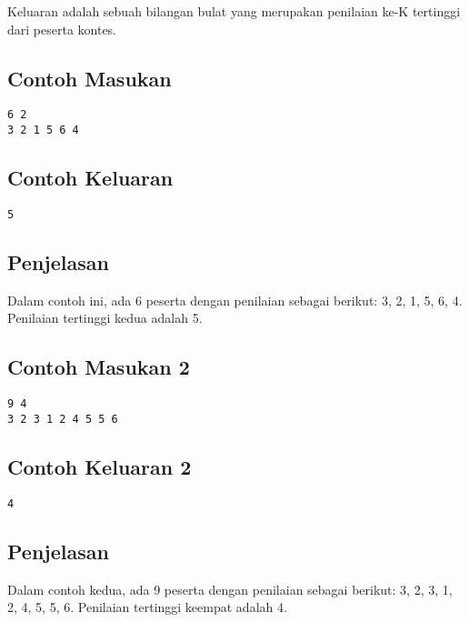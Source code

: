 \documentclass{article}
\begin{document}
Keluaran adalah sebuah bilangan bulat yang merupakan penilaian ke-K tertinggi dari peserta kontes.

\begin{multicols}{2}
\subsection*{Contoh Masukan}
\begin{lstlisting}
6 2
3 2 1 5 6 4
\end{lstlisting}
\columnbreak
\subsection*{Contoh Keluaran}
\begin{lstlisting}
5
\end{lstlisting}
\end{multicols}

\subsection*{Penjelasan}

Dalam contoh ini, ada 6 peserta dengan penilaian sebagai berikut: 3, 2, 1, 5, 6, 4. Penilaian tertinggi kedua adalah 5.

\begin{multicols}{2}
\subsection*{Contoh Masukan 2}
\begin{lstlisting}
9 4
3 2 3 1 2 4 5 5 6
\end{lstlisting}
\columnbreak
\subsection*{Contoh Keluaran 2}
\begin{lstlisting}
4
\end{lstlisting}
\end{multicols}

\subsection*{Penjelasan}

Dalam contoh kedua, ada 9 peserta dengan penilaian sebagai berikut: 3, 2, 3, 1, 2, 4, 5, 5, 6. Penilaian tertinggi keempat adalah 4.
\end{document}
